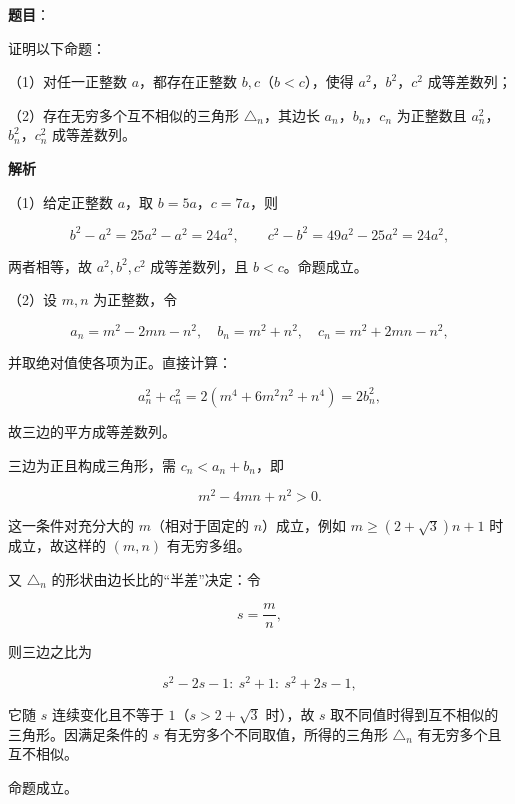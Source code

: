 \begin{answer}

\textbf{题目}：

证明以下命题：

（1）对任一正整数 $a$，都存在正整数 $b,c$（$b<c$），使得 $a^2$，$b^2$，$c^2$ 成等差数列；

（2）存在无穷多个互不相似的三角形 $\triangle_n$，其边长 $a_n$，$b_n$，$c_n$ 为正整数且 $a_n^2$，$b_n^2$，$c_n^2$ 成等差数列。

\textbf{解析}

（1）给定正整数 $a$，取 $b=5a$，$c=7a$，则

\nopagebreak[4]
\[b^2-a^2=25a^2-a^2=24a^2,\qquad c^2-b^2=49a^2-25a^2=24a^2,\]

两者相等，故 $a^2,b^2,c^2$ 成等差数列，且 $b<c$。命题成立。

（2）设 $m,n$ 为正整数，令

\nopagebreak[4]
\[a_n=m^2-2mn-n^2,\quad b_n=m^2+n^2,\quad c_n=m^2+2mn-n^2,\]

并取绝对值使各项为正。直接计算：

\nopagebreak[4]
\[a_n^2+c_n^2=2\left(m^4+6m^2n^2+n^4\right)=2b_n^2,\]

故三边的平方成等差数列。

三边为正且构成三角形，需 $c_n<a_n+b_n$，即

\nopagebreak[4]
\[m^2-4mn+n^2>0.\]

这一条件对充分大的 $m$（相对于固定的 $n$）成立，例如 $m\geqslant(2+\sqrt3)n+1$ 时成立，故这样的 $(m,n)$ 有无穷多组。

又 $\triangle_n$ 的形状由边长比的“半差”决定：令

\nopagebreak[4]
\[s=\frac{m}{n},\]

则三边之比为

\nopagebreak[4]
\[s^2-2s-1:\ s^2+1:\ s^2+2s-1,\]

它随 $s$ 连续变化且不等于 $1$（$s>2+\sqrt3$ 时），故 $s$ 取不同值时得到互不相似的三角形。因满足条件的 $s$ 有无穷多个不同取值，所得的三角形 $\triangle_n$ 有无穷多个且互不相似。

命题成立。


\end{answer}